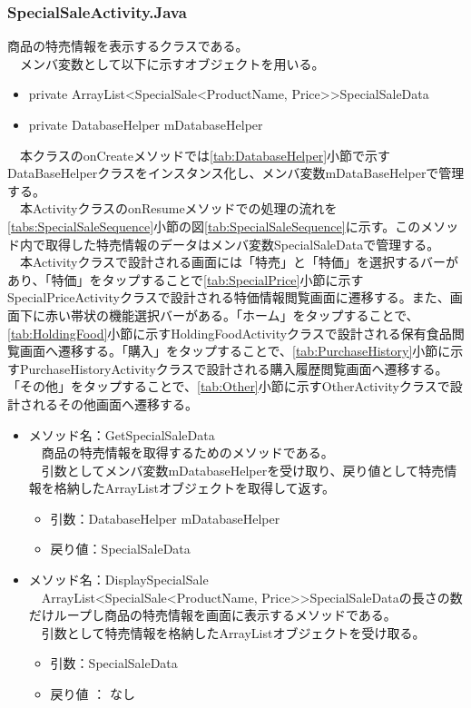 \documentclass[a4j]{jarticle}
\begin{document}
\subsubsection{SpecialSaleActivity.Java}
\label{tab:SpecialSale}
商品の特売情報を表示するクラスである。\\
　メンバ変数として以下に示すオブジェクトを用いる。
\begin{itemize}
\item private ArrayList\textless  SpecialSale\textless ProductName, Price\textgreater \textgreater  SpecialSaleData
\item private DatabaseHelper mDatabaseHelper
\end{itemize}
　本クラスのonCreateメソッドでは\ref{tab:DatabaseHelper}小節で示すDataBaseHelperクラスをインスタンス化し、メンバ変数mDataBaseHelperで管理する。\\
　本ActivityクラスのonResumeメソッドでの処理の流れを\ref{tabs:SpecialSaleSequence}小節の図\ref{tab:SpecialSaleSequence}に示す。このメソッド内で取得した特売情報のデータはメンバ変数SpecialSaleDataで管理する。\\
　本Activityクラスで設計される画面には「特売」と「特価」を選択するバーがあり、「特価」をタップすることで\ref{tab:SpecialPrice}小節に示すSpecialPriceActivityクラスで設計される特価情報閲覧画面に遷移する。また、画面下に赤い帯状の機能選択バーがある。「ホーム」をタップすることで、\ref{tab:HoldingFood}小節に示すHoldingFoodActivityクラスで設計される保有食品閲覧画面へ遷移する。「購入」をタップすることで、\ref{tab:PurchaseHistory}小節に示すPurchaseHistoryActivityクラスで設計される購入履歴閲覧画面へ遷移する。「その他」をタップすることで、\ref{tab:Other}小節に示すOtherActivityクラスで設計されるその他画面へ遷移する。
\begin{itemize}
\item メソッド名：GetSpecialSaleData\\
  　商品の特売情報を取得するためのメソッドである。\\
  　引数としてメンバ変数mDatabaseHelperを受け取り、戻り値として特売情報を格納したArrayListオブジェクトを取得して返す。
  \begin{itemize}
  \item 引数：DatabaseHelper mDatabaseHelper
  \item 戻り値：SpecialSaleData
  \end{itemize}

\item メソッド名：DisplaySpecialSale\\
  　ArrayList\textless  SpecialSale\textless ProductName, Price\textgreater \textgreater  SpecialSaleDataの長さの数だけループし商品の特売情報を画面に表示するメソッドである。\\
  　引数として特売情報を格納したArrayListオブジェクトを受け取る。
  \begin{itemize}
  \item 引数：SpecialSaleData
  \item 戻り値 ： なし
  \end{itemize}
\end{itemize}
\end{document}
